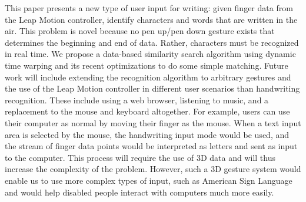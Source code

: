 This paper presents a new type of user input for writing: given finger data from the Leap Motion controller, identify characters and words that are written in the air. This problem is novel because no pen up/pen down gesture exists that determines the beginning and end of data. Rather, characters must be recognized in real time. We propose a data-based similarity search algorithm using dynamic time warping and its recent optimizations to do some simple matching. Future work will include extending the recognition algorithm to arbitrary gestures and the use of the Leap Motion controller in different user scenarios than handwriting recognition. These include using a web browser, listening to music, and a replacement to the mouse and keyboard altogether. For example, users can use their computer as normal by moving their finger as the mouse. When a text input area is selected by the mouse, the handwriting input mode would be used, and the stream of finger data points would be interpreted as letters and sent as input to the computer. This process will require the use of 3D data and will thus increase the complexity of the problem. However, such a 3D gesture system would enable us to use more complex types of input, such as American Sign Language and would help disabled people interact with computers much more easily.
